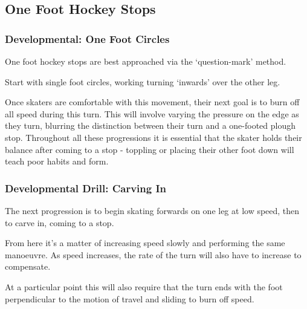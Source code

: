 \subsection{One Foot Hockey Stops}

\subsubsection{Developmental: One Foot Circles}
One foot hockey stops are best approached via the `question-mark' method.

Start with single foot circles, working turning `inwards' over the other leg.

Once skaters are comfortable with this movement, their next goal is to burn off all speed during this turn.
This will involve varying the pressure on the edge as they turn, blurring the distinction between their turn and a one-footed plough stop.
Throughout all these progressions it is essential that the skater holds their balance after coming to a stop - toppling or placing their other foot down will teach poor habits and form.  


\subsubsection{Developmental Drill: Carving In}

The next progression is to begin skating forwards on one leg at low speed, then to carve in, coming to a stop. 

From here it's a matter of increasing speed slowly and performing the same manoeuvre.
As speed increases, the rate of the turn will also have to increase to compensate.

At a particular point this will also require that the turn ends with the foot perpendicular to the motion of travel and sliding to burn off speed. 


